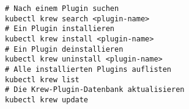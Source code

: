 \begin{verbatim}
# Nach einem Plugin suchen
kubectl krew search <plugin-name>
# Ein Plugin installieren
kubectl krew install <plugin-name>
# Ein Plugin deinstallieren
kubectl krew uninstall <plugin-name>
# Alle installierten Plugins auflisten
kubectl krew list
# Die Krew-Plugin-Datenbank aktualisieren
kubectl krew update
\end{verbatim}